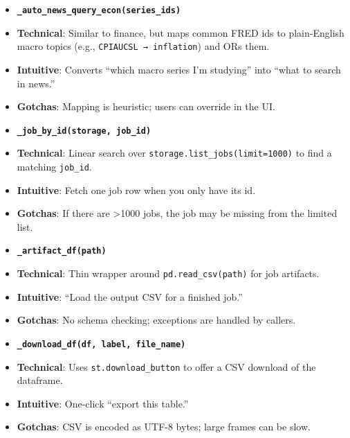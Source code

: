 \documentclass[11pt]{article}
\begin{document}
\begin{itemize}[leftmargin=*,nosep]
\item \textbf{\texttt{\_auto\_news\_query\_econ(series\_ids)}}
\item \textbf{Technical}: Similar to finance, but maps common FRED ids to plain-English macro topics (e.g., \texttt{CPIAUCSL → inflation}) and ORs them.
\item \textbf{Intuitive}: Converts “which macro series I’m studying” into “what to search in news.”
\item \textbf{Gotchas}: Mapping is heuristic; users can override in the UI.
\end{itemize}


\begin{itemize}[leftmargin=*,nosep]
\item \textbf{\texttt{\_job\_by\_id(storage, job\_id)}}
\item \textbf{Technical}: Linear search over \texttt{storage.list\_jobs(limit=1000)} to find a matching \texttt{job\_id}.
\item \textbf{Intuitive}: Fetch one job row when you only have its id.
\item \textbf{Gotchas}: If there are >1000 jobs, the job may be missing from the limited list.
\end{itemize}


\begin{itemize}[leftmargin=*,nosep]
\item \textbf{\texttt{\_artifact\_df(path)}}
\item \textbf{Technical}: Thin wrapper around \texttt{pd.read\_csv(path)} for job artifacts.
\item \textbf{Intuitive}: “Load the output CSV for a finished job.”
\item \textbf{Gotchas}: No schema checking; exceptions are handled by callers.
\end{itemize}


\begin{itemize}[leftmargin=*,nosep]
\item \textbf{\texttt{\_download\_df(df, label, file\_name)}}
\item \textbf{Technical}: Uses \texttt{st.download\_button} to offer a CSV download of the dataframe.
\item \textbf{Intuitive}: One-click “export this table.”
\item \textbf{Gotchas}: CSV is encoded as UTF-8 bytes; large frames can be slow.
\end{itemize}
\end{document}
